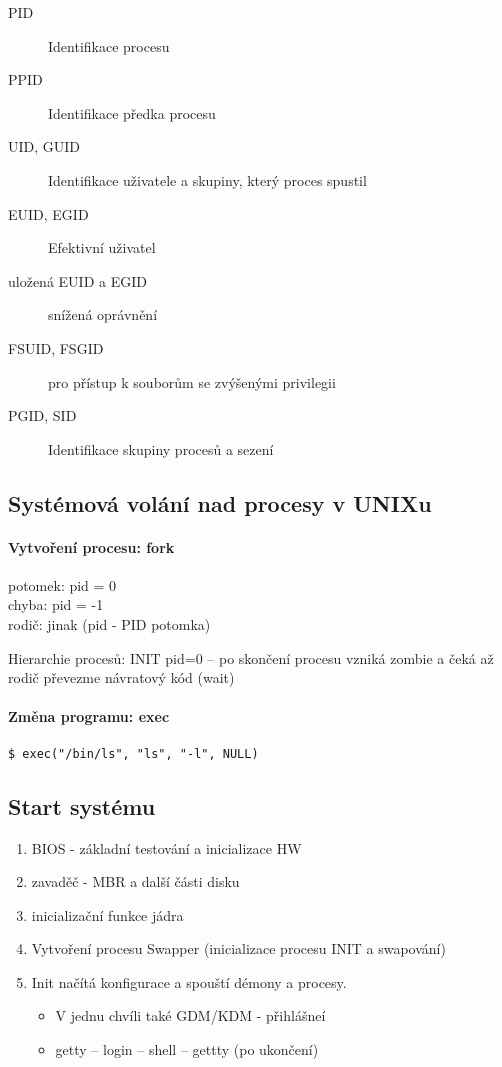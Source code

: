 \documentclass[a4paper, 11pt]{report}
\begin{document}
\begin{description}
	\item[PID] Identifikace procesu
	\item[PPID] Identifikace předka procesu
	\item[UID, GUID] Identifikace uživatele a skupiny, který proces spustil
	\item[EUID, EGID] Efektivní uživatel
	\item[uložená EUID a EGID] snížená oprávnění
	\item[FSUID, FSGID] pro přístup k souborům se zvýšenými privilegii
	\item[PGID, SID] Identifikace skupiny procesů a sezení
\end{description}

\subsection{Systémová volání nad procesy v UNIXu}

\paragraph{Vytvoření procesu: fork}

potomek: pid = 0\\
chyba: pid = -1\\
rodič: jinak (pid - PID potomka)

Hierarchie procesů: INIT pid=0 -- po skončení procesu vzniká zombie a čeká až rodič převezme návratový kód (wait)

\paragraph{Změna programu: exec}

\verb|$ exec("/bin/ls", "ls", "-l", NULL)|

\subsection{Start systému}
\begin{enumerate}
	\item BIOS - základní testování a inicializace HW
	\item zavaděč - MBR a další části disku
	\item inicializační funkce jádra
	\item Vytvoření procesu Swapper (inicializace procesu INIT a swapování)
	\item Init načítá konfigurace a spouští démony a procesy.
	\begin{itemize}
		\item V jednu chvíli také GDM/KDM - přihlášneí
		\item getty -- login -- shell -- gettty (po ukončení)
	\end{itemize}
\end{enumerate}
\end{document}
